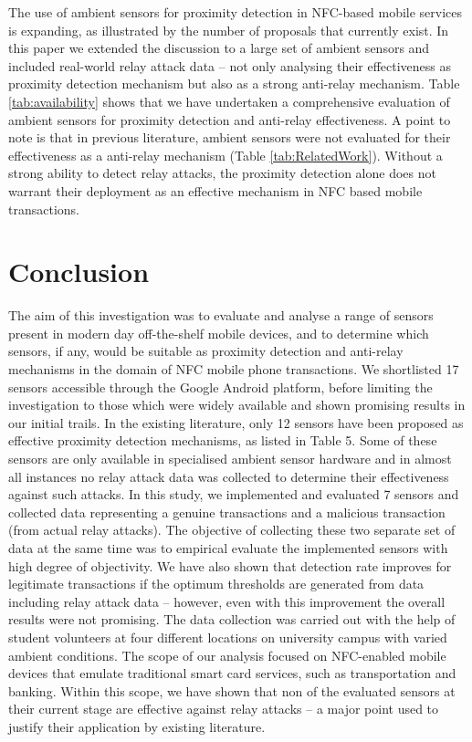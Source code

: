 \documentclass[runningheads,a4paper]{llncs}
\begin{document}
The use of ambient sensors for proximity detection in NFC-based mobile services is expanding, as illustrated by the number of proposals that currently exist.  In this paper we extended the discussion to a large set of ambient sensors and included real-world relay attack data -- not only analysing their effectiveness as proximity detection mechanism but also as a strong anti-relay mechanism. Table \ref{tab:availability} shows that we have undertaken a comprehensive evaluation of ambient sensors for proximity detection and anti-relay effectiveness. A point to note is that in previous literature, ambient sensors were not evaluated for their effectiveness as a anti-relay mechanism (Table \ref{tab:RelatedWork}). Without a strong ability to detect relay attacks, the proximity detection alone does not warrant their deployment as an effective mechanism in NFC based mobile transactions.   





\section{Conclusion}
The aim of this investigation was to evaluate and analyse a range of sensors present in modern day off-the-shelf mobile devices, and to determine which sensors, if any, would be suitable as proximity detection and anti-relay mechanisms in the domain of NFC mobile phone transactions.  We shortlisted 17 sensors accessible through the Google Android platform, before limiting the investigation to those which were widely available and shown promising results in our initial trails.  In the existing literature, only 12 sensors have been proposed as effective proximity detection mechanisms, as listed in Table 5. Some of these sensors are only available in specialised ambient sensor hardware and in almost all instances no relay attack data was collected to determine their effectiveness against such attacks. In this study, we implemented and evaluated 7 sensors and collected data representing a genuine transactions and a malicious transaction (from actual relay attacks). The objective of collecting these two separate set of data at the same time was to empirical evaluate the implemented sensors with high degree of objectivity. We have also shown that detection rate improves for legitimate transactions if the optimum thresholds are generated from data including relay attack data -- however, even with this improvement the overall results were not promising. The data collection was carried out with the help of student volunteers at four different locations on university campus with varied ambient conditions. 
The scope of our analysis focused on NFC-enabled mobile devices that emulate traditional smart card services, such as transportation and banking. Within this scope, we have shown that non of the evaluated sensors at their current stage are effective against relay attacks -- a major point used to justify their application by existing literature. 
\end{document}
